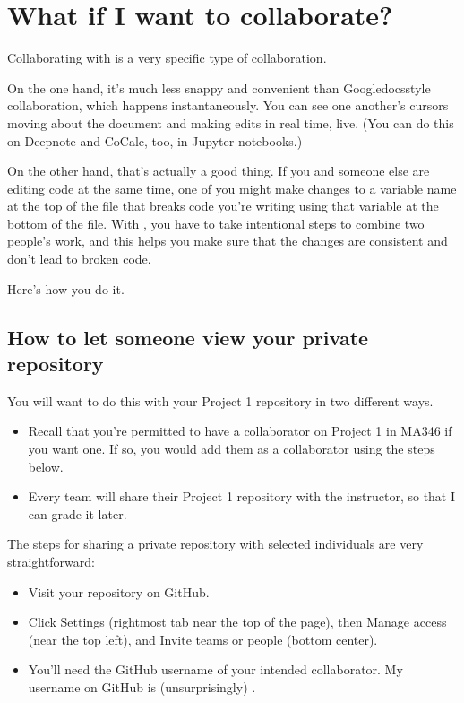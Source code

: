 \documentclass[letterpaper,10pt,english]{jupyterBook}
\begin{document}
\section{What if I want to collaborate?}
\label{\detokenize{chapter-8-version-control:what-if-i-want-to-collaborate}}
\sphinxAtStartPar
Collaborating with  is a very specific type of collaboration.

\sphinxAtStartPar
On the one hand, it’s much less snappy and convenient than Google\sphinxhyphen{}docs\sphinxhyphen{}style collaboration, which happens instantaneously.  You can see one another’s cursors moving about the document and making edits in real time, live.  (You can do this on Deepnote and CoCalc, too, in Jupyter notebooks.)

\sphinxAtStartPar
On the other hand, that’s actually a good thing.  If you and someone else are editing code at the same time, one of you might make changes to a variable name at the top of the file that breaks code you’re writing using that variable at the bottom of the file.  With , you have to take intentional steps to combine two people’s work, and this helps you make sure that the changes are consistent and don’t lead to broken code.

\sphinxAtStartPar
Here’s how you do it.


\subsection{How to let someone view your private repository}
\label{\detokenize{chapter-8-version-control:how-to-let-someone-view-your-private-repository}}
\sphinxAtStartPar
You will want to do this with your Project 1 repository in two different ways.
\begin{itemize}
\item {} 
\sphinxAtStartPar
Recall that you’re permitted to have a collaborator on Project 1 in MA346 if you want one.  If so, you would add them as a collaborator using the steps below.

\item {} 
\sphinxAtStartPar
Every team will share their Project 1 repository with the instructor, so that I can grade it later.

\end{itemize}

\sphinxAtStartPar
The steps for sharing a private repository with selected individuals are very straightforward:
\begin{itemize}
\item {} 
\sphinxAtStartPar
Visit your repository on GitHub.

\item {} 
\sphinxAtStartPar
Click Settings (rightmost tab near the top of the page), then Manage access (near the top left), and Invite teams or people (bottom center).

\item {} 
\sphinxAtStartPar
You’ll need the GitHub username of your intended collaborator.  My username on GitHub is (unsurprisingly) .

\end{itemize}
\end{document}
